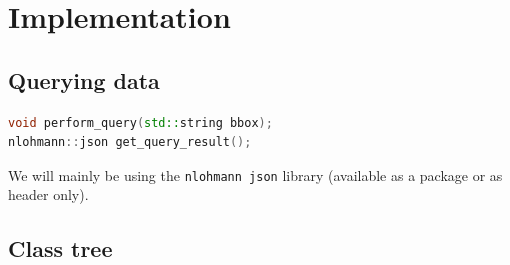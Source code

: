 \documentclass[12pt]{article}
\begin{document}
\section{Implementation}

\subsection{Querying data}
\begin{lstlisting}[language=C++]
void perform_query(std::string bbox);
nlohmann::json get_query_result();
\end{lstlisting}

We will mainly be using the \texttt{nlohmann json} library (available as a package or as 
header only).

\subsection{Class tree}
\end{document}
